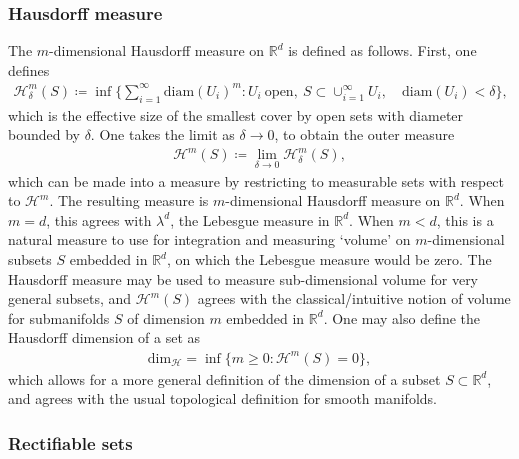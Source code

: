 \documentclass[sn-mathphys-num]{sn-jnl}%
\theoremstyle{thmstyleone}%
\theoremstyle{thmstyletwo}%
\theoremstyle{thmstylethree}%
\numberwithin{remark}{section}
\numberwithin{definition}{section}
\numberwithin{equation}{section}
\numberwithin{theorem}{section}
\newcommand{\R}{\ensuremath{\mathbb{R}}}%
\begin{document}
\subsubsection{Hausdorff measure}
The $m$-dimensional Hausdorff measure on $\R^{d}$ is defined as follows. First, one defines
\begin{align*}
    \mathcal{H}_{\delta}^{m}(S) \coloneq \inf\bigg\{ \sum_{i=1}^{ \infty}{\mathrm{diam}(U_{i})^{m}}\colon U_{i}\ \mathrm{open},\  S \subset \cup_{i=1}^{\infty}{U_{i}},\quad \mathrm{diam}(U_{i}) < \delta\bigg\},
\end{align*}
which is the effective size of the smallest cover by open sets with diameter bounded by $\delta$. One takes the limit as $\delta \to 0$, to obtain the outer measure
\begin{align*}
    \mathcal{H}^{m}(S) \coloneq \lim_{\delta\to 0}{\mathcal{H}^{m}_{\delta}}(S),
\end{align*}
which can be made into a measure by restricting to measurable sets with respect to $\mathcal{H}^{m}$. The resulting measure is $m$-dimensional Hausdorff measure on $\R^{d}$. When $m=d$, this agrees with $\lambda^{d}$, the Lebesgue measure in $\R^{d}$. When $m<d$, this is a natural measure to use for integration and measuring `volume' on $m$-dimensional subsets $S$ embedded in $\R^{d}$, on which the Lebesgue measure would be zero. The Hausdorff measure may be used to measure sub-dimensional volume for very general subsets, and $\mathcal{H}^{m}(S)$ agrees with the classical/intuitive notion of volume for submanifolds $S$ of dimension $m$ embedded in $\R^{d}$. One may also define the Hausdorff dimension of a set as 
\begin{align*}
    \mathrm{dim}_{\mathcal{H}} = \inf\{m\geq 0\colon \mathcal{H}^{m}(S)=0\},
\end{align*}
which allows for a more general definition of the dimension of a subset $S\subset \R^{d}$, and agrees with the usual topological definition for smooth manifolds.
\subsubsection{Rectifiable sets}
\end{document}
